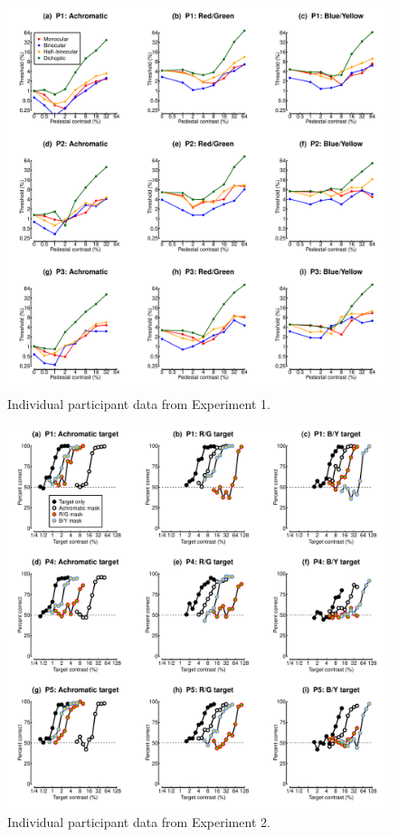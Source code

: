 \documentclass[
  letterpaper,
  DIV=11,
  numbers=noendperiod]{scrartcl}
\begin{document}
\begin{figure}

{\centering \includegraphics{Figures/individualdippers.pdf}

}

\caption{\label{fig-individualdippers}Individual participant data from
Experiment 1.}

\end{figure}

\begin{figure}

{\centering \includegraphics{Figures/individualMCS.pdf}

}

\caption{\label{fig-individualMCS}Individual participant data from
Experiment 2.}

\end{figure}
\end{document}
